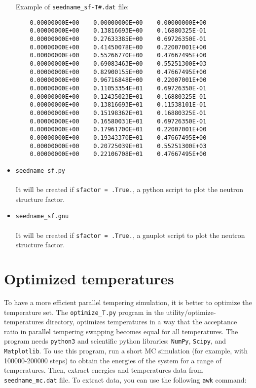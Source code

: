 \documentclass[10pt]{report}
\begin{document}
\begin{itemize}
Example of {\tt seedname\_sf-T\#.dat}  file:
{\scriptsize    
\begin{verbatim}
    0.00000000E+00    0.00000000E+00    0.00000000E+00
    0.00000000E+00    0.13816693E+00    0.16880325E-01
    0.00000000E+00    0.27633385E+00    0.69726350E-01
    0.00000000E+00    0.41450078E+00    0.22007001E+00
    0.00000000E+00    0.55266770E+00    0.47667495E+00
    0.00000000E+00    0.69083463E+00    0.55251300E+03
    0.00000000E+00    0.82900155E+00    0.47667495E+00
    0.00000000E+00    0.96716848E+00    0.22007001E+00
    0.00000000E+00    0.11053354E+01    0.69726350E-01
    0.00000000E+00    0.12435023E+01    0.16880325E-01
    0.00000000E+00    0.13816693E+01    0.11538101E-01
    0.00000000E+00    0.15198362E+01    0.16880325E-01
    0.00000000E+00    0.16580031E+01    0.69726350E-01
    0.00000000E+00    0.17961700E+01    0.22007001E+00
    0.00000000E+00    0.19343370E+01    0.47667495E+00
    0.00000000E+00    0.20725039E+01    0.55251300E+03
    0.00000000E+00    0.22106708E+01    0.47667495E+00
\end{verbatim}
}
\item {\tt seedname\_sf.py}\\\\    
 It will be created if {\tt sfactor = .True.}, 
a python script to plot the neutron structure factor.
\item {\tt seedname\_sf.gnu}\\\\    
 It will be created  if {\tt sfactor = .True.}, a gnuplot script to plot the neutron structure factor.
\end{itemize}

\section{Optimized temperatures}
To have a more efficient parallel tempering simulation, it is better to optimize the temperature set.
The {\tt optimize\_T.py} program in the utility/optimize-temperatures directory, 
optimizes temperatures in a way that the acceptance ratio in parallel tempering swapping becomes equal for all temperatures.
The program needs {\tt python3} and scientific python libraries: {\tt NumPy}, {\tt Scipy}, and {\tt Matplotlib}.
To use this program, run a short MC simulation (for example, with 100000-200000 steps) to obtain the energies of the system for a range of temperatures. 
Then, extract energies and temperatures data from {\tt seedname\_mc.dat} file.
To extract data, you can use the following {\tt awk} command:
\end{document}
